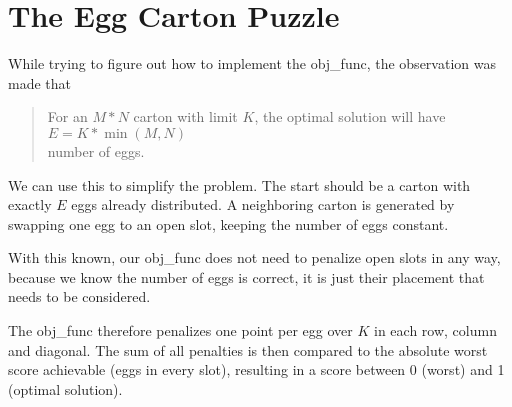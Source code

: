 \section*{The Egg Carton Puzzle}
While trying to figure out how to implement the obj\_func, the observation was made that
\begin{quote}
    For an $M*N$ carton with limit $K$, the optimal solution will have \\
    $E = K * \min (M, N)$\\
    number of eggs.
\end{quote}
We can use this to simplify the problem.
The start should be a carton with exactly $E$ eggs already distributed.
A neighboring carton is generated by swapping one egg to an open slot,
keeping the number of eggs constant.

With this known, our obj\_func does not need to penalize open slots in any way,
because we know the number of eggs is correct, it is just their placement that needs to be considered.

The obj\_func therefore penalizes one point per egg over $K$ in each row, column and diagonal.
The sum of all penalties is then compared to the absolute worst score achievable (eggs in every slot),
resulting in a score between 0 (worst) and 1 (optimal solution).





